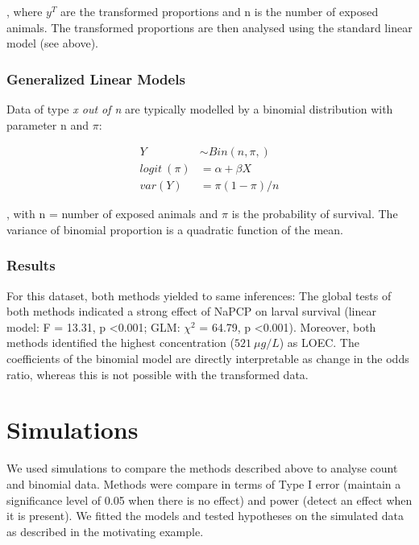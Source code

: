 \documentclass{scrartcl}
\begin{document}
, where $y^T$ are the transformed proportions and n is the number of exposed animals.
The transformed proportions are then analysed using the standard linear model (see above).

\subsubsection{Generalized Linear Models}

Data of type \emph{x out of n} are typically modelled by a binomial distribution with parameter n and $\pi$:

$$\begin{aligned}
  Y &\sim Bin(n, \pi,) \nonumber \\
  logit~(\pi) &= \alpha + \beta X \nonumber \label{eqn:bin} \\
  var(Y) &=  \pi (1 - \pi) / n \nonumber
\end{aligned}$$

, with n = number of exposed animals and $\pi$ is the probability of survival.
The variance of binomial proportion is a quadratic function of the mean.


\subsubsection{Results}
For this dataset, both methods yielded to same inferences:
The global tests of both methods indicated a strong effect of NaPCP on larval survival (linear model: F = 13.31, p \textless 0.001; GLM: $\chi^2$ = 64.79, p \textless 0.001).
Moreover, both methods identified the highest concentration ($521~\mu g / L$) as LOEC. 
The coefficients of the binomial model are directly interpretable as change in the odds ratio, whereas this is not possible with the transformed data.







\section{Simulations}
We used simulations to compare the methods described above to analyse count and binomial data.
Methods were compare in terms of Type I error (maintain a significance level of 0.05 when there is no effect) and power (detect an effect when it is present). 
We fitted the models and tested hypotheses on the simulated data as described in the motivating example.
\end{document}
